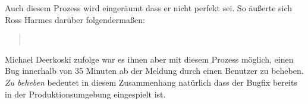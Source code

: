Auch diesem Prozess wird eingeräumt dass er nicht perfekt sei. So äußerte sich
Ross Harmes darüber folgendermaßen:

\begin{quote}
~\cite{flickr09}
\end{quote}

Michael Deerkoski zufolge \cite{flickr11} war es ihnen aber mit diesem Prozess
möglich, einen Bug innerhalb von 35 Minuten ab der Meldung durch einen
Benutzer zu beheben. \emph{Zu beheben} bedeutet in diesem Zusammenhang
natürlich dass der Bugfix bereits in der Produktionsumgebung eingespielt ist.


